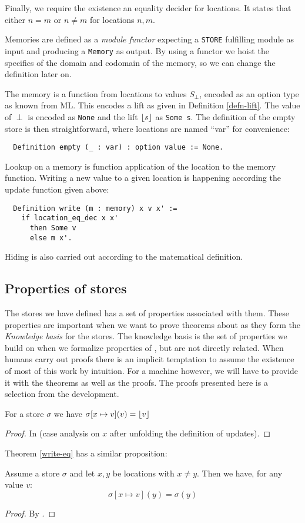 Finally, we require the existence an equality decider for
locations. It states that either $n = m$ or $n \neq m$ for locations
$n, m$.

Memories are defined as a \emph{module functor} expecting a
\texttt{STORE} fulfilling module as input and producing a
\texttt{Memory} as output. By using a functor we hoist the specifics
of the domain and codomain of the memory, so we can change the
definition later on.

The memory is a function from locations to values $S_{\perp}$, encoded
as an option type as known from ML. This encodes a lift as given in
Definition \ref{defn-lift}. The value of $\perp$ is encoded as
\texttt{None} and the lift $\lfloor s \rfloor$ as \texttt{Some s}. The
definition of the empty store is then straightforward, where locations
are named ``var'' for convenience:
\begin{verbatim}
  Definition empty (_ : var) : option value := None.
\end{verbatim}
Lookup on a memory is function application of the location to the
memory function. Writing a new value to a given location is happening
according the update function given above:
\begin{verbatim}
  Definition write (m : memory) x v x' :=
    if location_eq_dec x x'
      then Some v
      else m x'.
\end{verbatim}
Hiding is also carried out according to the matematical definition.

\subsection{Properties of stores}

The stores we have defined has a set of properties associated with
them. These properties are important when we want to prove theorems
about \janusz{} as they form the \emph{Knowledge basis} for the
stores. The knowledge basis is the set of properties we build on when
we formalize properties of \janusz{}, but are not directly
related. When humans carry out proofs there is an implicit temptation
to assume the existence of most of this work by intuition. For a
machine however, we will have to provide it with the theorems as well
as the proofs. The proofs presented here is a selection from the
development.

\begin{thm}
  \label{write-eq}
  For a store $\sigma$ we have $\sigma[x \mapsto v](v) = \lfloor v \rfloor$
\end{thm}
\begin{proof}
  In \coq{} (case analysis on $x$ after unfolding the definition of updates).
\end{proof}
Theorem \ref{write-eq} has a similar proposition:
\begin{thm}
  Assume a store $\sigma$ and let $x, y$ be locations with $x \neq
  y$. Then we have, for any value $v$:
  \begin{equation*}
    \sigma[x \mapsto v](y) = \sigma(y)
  \end{equation*}
\end{thm}
\begin{proof}
  By \coq{}.
\end{proof}



